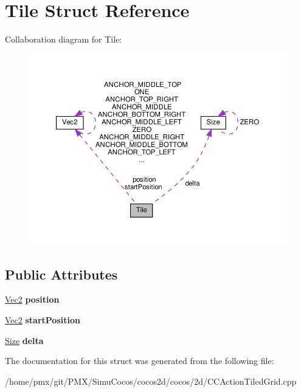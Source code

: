 \hypertarget{structTile}{}\section{Tile Struct Reference}
\label{structTile}


Collaboration diagram for Tile\+:
\nopagebreak
\begin{figure}[H]
\begin{center}
\leavevmode
\includegraphics[width=350pt]{structTile__coll__graph}
\end{center}
\end{figure}
\subsection*{Public Attributes}
\begin{DoxyCompactItemize}
\item 
\mbox{\label{structTile_a350bb5036c0d1bcee3587b7f0d5f8dff}} 
\hyperlink{classVec2}{Vec2} {\bfseries position}
\item 
\mbox{\label{structTile_a2607808edff7c3fb31b0aadfccec598d}} 
\hyperlink{classVec2}{Vec2} {\bfseries start\+Position}
\item 
\mbox{\label{structTile_a22edd94f4cf1b3bce3d87137c3816464}} 
\hyperlink{classSize}{Size} {\bfseries delta}
\end{DoxyCompactItemize}


The documentation for this struct was generated from the following file\+:\begin{DoxyCompactItemize}
\item 
/home/pmx/git/\+P\+M\+X/\+Simu\+Cocos/cocos2d/cocos/2d/C\+C\+Action\+Tiled\+Grid.\+cpp\end{DoxyCompactItemize}
